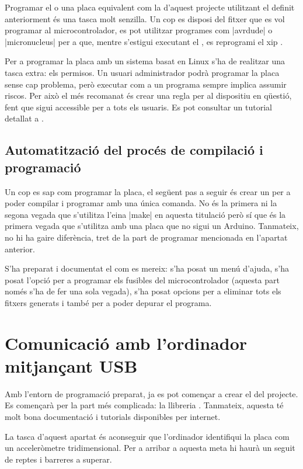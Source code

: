 Programar el  o una placa equivalent com la d'aquest projecte
utilitzant el  definit anteriorment és una tasca molt senzilla.
Un cop es disposi del fitxer  que es vol programar al
microcontrolador, es pot utilitzar programes com \ord|avrdude| o
\est|micronucleus| per a que, mentre s'estigui executant el , es 
reprogrami el xip \cite{DigisparkBootloader}.

Per a programar la placa amb un sistema basat en Linux s'ha de realitzar una
tasca extra: els permisos. Un usuari administrador podrà programar la placa
sense cap problema, però executar com a  un programa sempre implica
assumir riscos. Per això el més recomanat és crear una regla 
per al dispositiu en qüestió, fent que sigui accessible per a tots els usuaris.
Es pot consultar un tutorial detallat a \cite{CreateUdevRules}.

\subsection{Automatització del procés de compilació i programació}

Un cop es sap com programar la placa, el següent pas a seguir és crear un
 per a poder compilar i programar amb una única comanda.
No és la primera ni la segona vegada que s'utilitza l'eina \ord|make| en
aquesta titulació però sí que és la primera vegada que s'utilitza amb una placa
que no sigui un Arduino. Tanmateix, no hi ha gaire diferència, tret de la
part de programar mencionada en l'apartat anterior.

S'ha preparat i documentat el  com es mereix: s'ha posat un menú
d'ajuda, s'ha posat l'opció per a programar els fusibles del microcontrolador
(aquesta part només s'ha de fer una sola vegada), s'ha posat opcions per a
eliminar tots els fitxers generats i també per a poder depurar el programa.

\section{Comunicació amb l'ordinador mitjançant USB}

Amb l'entorn de programació preparat, ja es pot començar a crear el
 del projecte. Es començarà per la part més complicada: la
llibreria . Tanmateix, aquesta té molt bona documentació i
tutorials disponibles per internet.

La tasca d'aquest apartat és aconseguir que l'ordinador identifiqui la placa
com un acceleròmetre tridimensional. Per a arribar a aquesta meta hi haurà un
seguit de reptes i barreres a superar.


